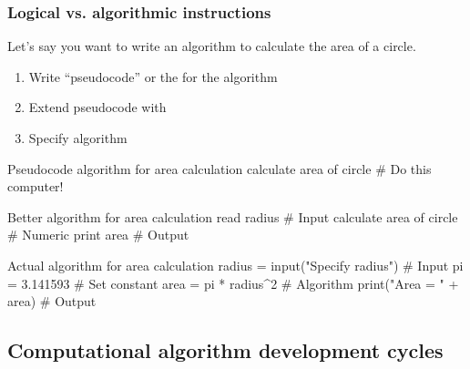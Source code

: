\documentclass[hyperref={colorlinks=true}]{beamer}
\begin{document}
\begin{frame}[fragile]
  \frametitle{Logical vs. algorithmic instructions}
    
    
  Let's say you want to write an algorithm to calculate the area of a circle. 
  
  \begin{enumerate}[<+->]
    \item Write ``pseudocode'' or the  for the algorithm
    \item Extend pseudocode with 
    \item Specify algorithm 
  \end{enumerate}
    
  \begin{ucpythonblock}{Pseudocode algorithm for area calculation}
calculate area of circle  # Do this computer!
  \end{ucpythonblock}

  \pause

  \begin{ucpythonblock}{Better algorithm for area calculation}
read radius              # Input
calculate area of circle # Numeric
print area               # Output
  \end{ucpythonblock}
  
  \pause

  \begin{ucpythonblock}{Actual algorithm for area calculation}
radius = input("Specify radius")  # Input
pi     = 3.141593                 # Set constant
area   = pi  * radius^2           # Algorithm
print("Area = " + area)           # Output 
  \end{ucpythonblock}
  
  
\end{frame}

\subsection[Computational algorithm development cycles]{Computational algorithm development cycles}
\end{document}

